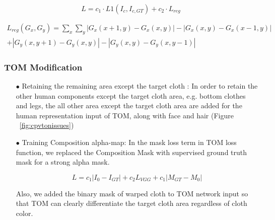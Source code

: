 \begin{itemize}


\begin{equation}
 L  = c_1 \cdot L1(I_c, I_{c,GT}) + c_2 \cdot  L_{reg}  
\end{equation}

\begin{equation}\label{eq:gridloss}
\begin{aligned}
 L_{reg} (G_x, G_y) = \sum_x \sum_y | G_x(x+1, y) - G_x(x, y) | - | G_x(x, y) - G_x(x-1, y) | \\
 + | G_y(x, y+1) - G_y(x, y) | - | G_y(x, y) - G_y(x, y-1) |
\end{aligned}
\end{equation}


\end{itemize}

\subsubsection{TOM Modification}


\begin{itemize}

\item[$\bullet$] Retaining the remaining area except the target cloth  :
In order to retain the other human components except the target cloth area, e.g. bottom clothes and legs, the all other area except the target cloth area are added for the human representation input of TOM, along with face and hair (Figure ~\ref{fig:cpvtonissues})

\item[$\bullet$] Training Composition alpha-map:  
In the mask loss term in TOM loss function, we replaced the Composition Mask with supervised ground truth mask for a strong alpha mask.

\begin{equation}
L=c_1 |I_0-I_{GT} |+  c_2 L_{VGG}+c_1 |M_{GT}-M_0 |       
\end{equation}

Also, we added the binary mask of warped cloth to TOM network input so that TOM can clearly differentiate the target cloth area regardless of cloth color.  


\end{itemize}


